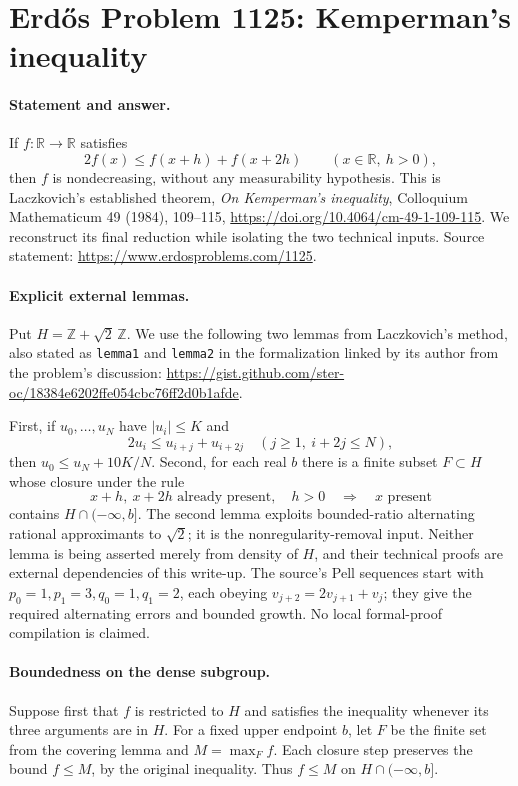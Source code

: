 \section*{Erd\H{o}s Problem 1125: Kemperman's inequality}

\paragraph{Statement and answer.}
If \(f:\mathbb R\to\mathbb R\) satisfies
\[
 2f(x)\leq f(x+h)+f(x+2h)\qquad(x\in\mathbb R,\ h>0),
\]
then \(f\) is nondecreasing, without any measurability hypothesis.
This is Laczkovich's established theorem, \emph{On Kemperman's inequality}, Colloquium Mathematicum 49 (1984), 109--115, \url{https://doi.org/10.4064/cm-49-1-109-115}.
We reconstruct its final reduction while isolating the two technical inputs. Source statement: \url{https://www.erdosproblems.com/1125}.

\paragraph{Explicit external lemmas.}
Put \(H=\mathbb Z+\sqrt2\,\mathbb Z\).
We use the following two lemmas from Laczkovich's method, also stated as \texttt{lemma1} and \texttt{lemma2} in the formalization linked by its author from the problem's discussion:
\url{https://gist.github.com/ster-oc/18384e6202ffe054cbc76ff2d0b1afde}.

First, if \(u_0,\ldots,u_N\) have \(|u_i|\leq K\) and
\[
 2u_i\leq u_{i+j}+u_{i+2j}\quad(j\geq1,\ i+2j\leq N),
\]
then \(u_0\leq u_N+10K/N\).
Second, for each real \(b\) there is a finite subset \(F\subset H\) whose closure under the rule
\[
 x+h,\ x+2h\text{ already present},\quad h>0
 \quad\Longrightarrow\quad x\text{ present}
\]
contains \(H\cap(-\infty,b]\).
The second lemma exploits bounded-ratio alternating rational approximants to \(\sqrt2\); it is the nonregularity-removal input. Neither lemma is being asserted merely from density of \(H\), and their technical proofs are external dependencies of this write-up.
The source's Pell sequences start with \(p_0=1,p_1=3,q_0=1,q_1=2\), each obeying \(v_{j+2}=2v_{j+1}+v_j\); they give the required alternating errors and bounded growth. No local formal-proof compilation is claimed.

\paragraph{Boundedness on the dense subgroup.}
Suppose first that \(f\) is restricted to \(H\) and satisfies the inequality whenever its three arguments are in \(H\).
For a fixed upper endpoint \(b\), let \(F\) be the finite set from the covering lemma and \(M=\max_{F}f\). Each closure step preserves the bound \(f\leq M\), by the original inequality. Thus \(f\leq M\) on \(H\cap(-\infty,b]\).

